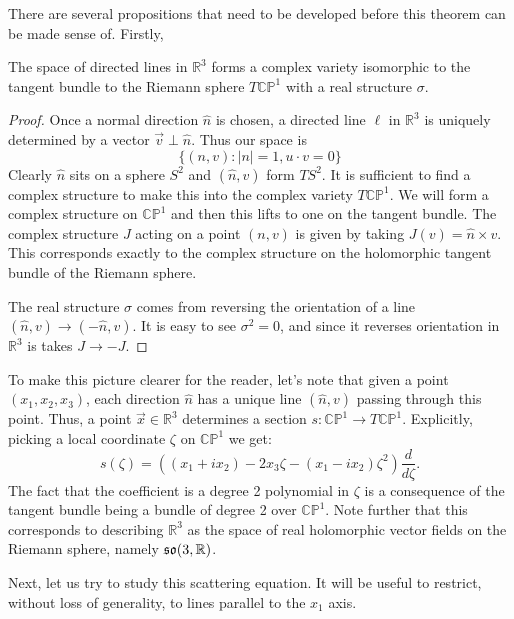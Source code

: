 	There are several propositions that need to be developed before this theorem can be made sense of. Firstly, 
	\begin{prop}
		The space of directed lines in $\mathbb R^3$ forms a complex variety isomorphic to the tangent bundle to the Riemann sphere $T \mathbb{CP}^1$ with a real structure $\sigma$.
	\end{prop}
	\begin{proof}
		Once a normal direction $\hat n$ is chosen, a directed line $\ell$ in $\mathbb R^3$ is uniquely determined by a vector $\vec v \perp \hat n$. Thus our space is
		\begin{equation}
			\{ (n, v) : |n| = 1, u \cdot v = 0\}
		\end{equation}
		Clearly $\hat n$ sits on a sphere $S^2$ and $(\hat n, v)$ form $T S^2$. It is sufficient to find a complex structure to make this into the complex variety $T \mathbb{CP}^1$. We will form a complex structure on $\mathbb{CP}^1$ and then this lifts to one on the tangent bundle. 
		The complex structure $J$ acting on a point $(n, v)$ is given by taking $J(v) = \hat n \times v$. This corresponds exactly to the complex structure on the holomorphic tangent bundle of the Riemann sphere.
		
		The real structure $\sigma$ comes from reversing the orientation of a line $(\hat n, v) \to (-\hat n, v)$. It is easy to see $\sigma^2 = 0$, and since it reverses orientation in $\mathbb R^3$ is takes $J \to -J$.
	\end{proof}
	\begin{eg}
		To make this picture clearer for the reader, let's note that given a point $(x_1, x_2, x_3)$, each direction $\hat n$ has a unique line $(\hat n, v)$ passing through this point.
		Thus, a point $\vec x \in \mathbb R^3$ determines a section $s: \mathbb{CP}^1 \to T\mathbb{CP}^1$. Explicitly, picking a local coordinate $\zeta$ on $\mathbb{CP}^1$ we get:
		\begin{equation}
			s(\zeta) = ((x_1 + i x_2) - 2x_3 \zeta - (x_1 - i x_2)\zeta^2) \frac{d}{d\zeta}.
		\end{equation}
		The fact that the coefficient is a degree 2 polynomial in $\zeta$ is a consequence of the tangent bundle being a bundle of degree 2 over $\mathbb{CP}^1$. Note further that this corresponds to describing $\mathbb R^3$ as the space of real holomorphic vector fields on the Riemann sphere, namely $\frak{so}(3, \mathbb R)$.
	\end{eg}

	Next, let us try to study this scattering equation. It will be useful to restrict, without loss of generality, to lines parallel to the $x_1$ axis. 
	
